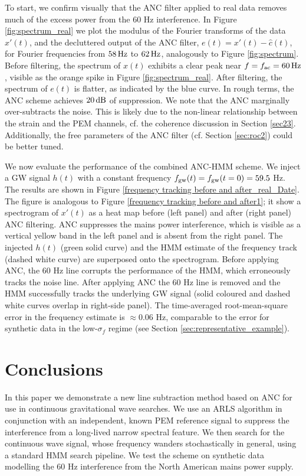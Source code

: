 \documentclass[pra,superscriptaddress,reprint,amsmath,amssymb,nofootinbib]{revtex4-2}
\begin{document}
To start, we confirm visually that the ANC filter applied to real data removes much of the excess power from the 60 Hz interference. In Figure \ref{fig:spectrum_real} we plot the modulus of the Fourier transforms of the  data $x'(t)$, and the decluttered output of the ANC filter, $e(t) = x'(t) - \hat{c}(t)$, for Fourier frequencies from $58 \, {\rm Hz}$ to $62 \, {\rm Hz}$, analogously to Figure \ref{fig:spectrum}. Before filtering, the spectrum of $x(t)$ exhibits a clear peak near $f = f_{\rm ac} = 60 \, {\rm Hz}$, visible as the orange spike in Figure \ref{fig:spectrum_real}. After filtering, the spectrum of $e(t)$ is flatter, as indicated by the blue curve. In rough terms, the ANC scheme achieves $20 \, {\rm dB}$ of suppression. We note that the ANC marginally over-subtracts the noise. This is likely due to the non-linear relationship between the strain and the PEM channels, cf. the coherence discussion in Section \ref{sec23}. Additionally, the free parameters of the ANC filter (cf. Section \ref{sec:roc2}) could be better tuned. \newline 


We now evaluate the performance of the combined ANC-HMM scheme. We inject a GW signal $h(t)$ with a constant frequency $f_{\rm gw}(t) = f_{\rm gw} (t=0) = 59.5 $ Hz. The results are shown in Figure \ref{frequency tracking before and after_real_Date}. The figure is analogous to Figure \ref{frequency tracking before and after1}; 
it show a spectrogram of $x'(t)$ as a heat map before (left panel) and after (right panel) ANC filtering. ANC suppresses the mains power interference, which is visible as a vertical yellow band in the left panel and is absent from the right panel. The injected $h(t)$ (green solid curve) and the HMM estimate of the frequency track (dashed white curve) are superposed onto the spectrogram. Before applying ANC, the 60 Hz line corrupts the performance of the HMM, which erroneously tracks the noise line. After applying ANC the 60 Hz line is removed and the HMM successfully tracks the underlying GW signal (solid coloured and dashed white curves overlap in right-side panel). The time-averaged root-mean-square error in the frequency estimate is $\approx 0.06$ Hz, comparable to the error for synthetic data in the low-$\sigma_f$ regime (see Section \ref{sec:representative_example}).






\section{Conclusions}\label{sec:conclusions}
In this paper we demonstrate a new line subtraction method based on ANC for use in continuous gravitational wave searches. We use an ARLS algorithm in conjunction with an independent, known PEM reference signal to suppress the interference from a long-lived narrow spectral feature. We then search for the continuous wave signal, whose frequency wanders stochastically in general, using a standard HMM search pipeline. We test the scheme on synthetic data modelling the 60 Hz interference from the North American mains power supply. \newline 
\end{document}
